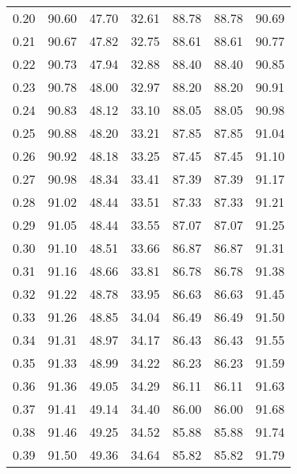 \begin{tabular}{|c|c|c|c|c|c|c|}
      0.20 &     90.60 &     47.70 &      32.61 &   88.78 &      88.78 &         90.69 \\
      0.21 &     90.67 &     47.82 &      32.75 &   88.61 &      88.61 &         90.77 \\
      0.22 &     90.73 &     47.94 &      32.88 &   88.40 &      88.40 &         90.85 \\
      0.23 &     90.78 &     48.00 &      32.97 &   88.20 &      88.20 &         90.91 \\
      0.24 &     90.83 &     48.12 &      33.10 &   88.05 &      88.05 &         90.98 \\
      0.25 &     90.88 &     48.20 &      33.21 &   87.85 &      87.85 &         91.04 \\
      0.26 &     90.92 &     48.18 &      33.25 &   87.45 &      87.45 &         91.10 \\
      0.27 &     90.98 &     48.34 &      33.41 &   87.39 &      87.39 &         91.17 \\
      0.28 &     91.02 &     48.44 &      33.51 &   87.33 &      87.33 &         91.21 \\
      0.29 &     91.05 &     48.44 &      33.55 &   87.07 &      87.07 &         91.25 \\
      0.30 &     91.10 &     48.51 &      33.66 &   86.87 &      86.87 &         91.31 \\
      0.31 &     91.16 &     48.66 &      33.81 &   86.78 &      86.78 &         91.38 \\
      0.32 &     91.22 &     48.78 &      33.95 &   86.63 &      86.63 &         91.45 \\
      0.33 &     91.26 &     48.85 &      34.04 &   86.49 &      86.49 &         91.50 \\
      0.34 &     91.31 &     48.97 &      34.17 &   86.43 &      86.43 &         91.55 \\
      0.35 &     91.33 &     48.99 &      34.22 &   86.23 &      86.23 &         91.59 \\
      0.36 &     91.36 &     49.05 &      34.29 &   86.11 &      86.11 &         91.63 \\
      0.37 &     91.41 &     49.14 &      34.40 &   86.00 &      86.00 &         91.68 \\
      0.38 &     91.46 &     49.25 &      34.52 &   85.88 &      85.88 &         91.74 \\
      0.39 &     91.50 &     49.36 &      34.64 &   85.82 &      85.82 &         91.79 \\

\end{tabular}
